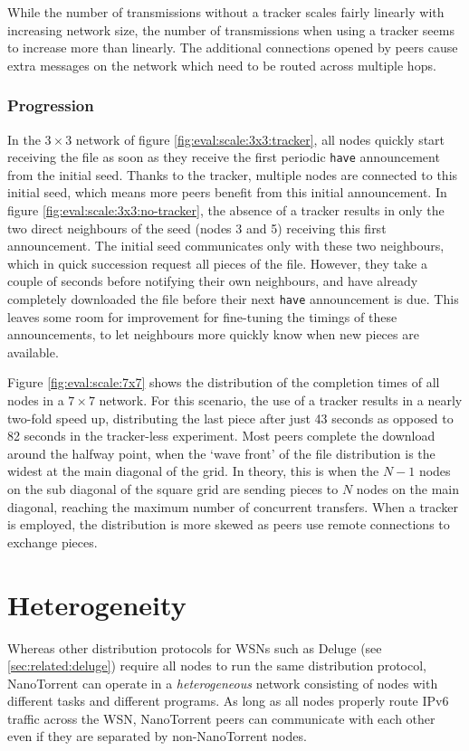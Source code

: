 While the number of transmissions without a tracker scales fairly linearly with increasing network size, the number of transmissions when using a tracker seems to increase more than linearly. The additional connections opened by peers cause extra messages on the network which need to be routed across multiple hops.

\subsubsection{Progression}
In the $3 \times 3$ network of figure \ref{fig:eval:scale:3x3:tracker}, all nodes quickly start receiving the file as soon as they receive the first periodic \texttt{have} announcement from the initial seed. Thanks to the tracker, multiple nodes are connected to this initial seed, which means more peers benefit from this initial announcement. In figure \ref{fig:eval:scale:3x3:no-tracker}, the absence of a tracker results in only the two direct neighbours of the seed (nodes 3 and 5) receiving this first announcement. The initial seed communicates only with these two neighbours, which in quick succession request all pieces of the file. However, they take a couple of seconds before notifying their own neighbours, and have already completely downloaded the file before their next \texttt{have} announcement is due. This leaves some room for improvement for fine-tuning the timings of these announcements, to let neighbours more quickly know when new pieces are available.

Figure \ref{fig:eval:scale:7x7} shows the distribution of the completion times of all nodes in a $7 \times 7$ network. For this scenario, the use of a tracker results in a nearly two-fold speed up, distributing the last piece after just 43 seconds as opposed to 82 seconds in the tracker-less experiment. Most peers complete the download around the halfway point, when the `wave front' of the file distribution is the widest at the main diagonal of the grid. In theory, this is when the $N-1$ nodes on the sub diagonal of the square grid are sending pieces to $N$ nodes on the main diagonal, reaching the maximum number of concurrent transfers. When a tracker is employed, the distribution is more skewed as peers use remote connections to exchange pieces.

\section{Heterogeneity}
\label{sec:eval:hetero}
Whereas other distribution protocols for \glspl{WSN} such as Deluge (see \ref{sec:related:deluge}) require all nodes to run the same distribution protocol, NanoTorrent can operate in a \emph{heterogeneous} network consisting of nodes with different tasks and different programs. As long as all nodes properly route \gls{IPv6} traffic across the \gls{WSN}, NanoTorrent peers can communicate with each other even if they are separated by non-NanoTorrent nodes.

